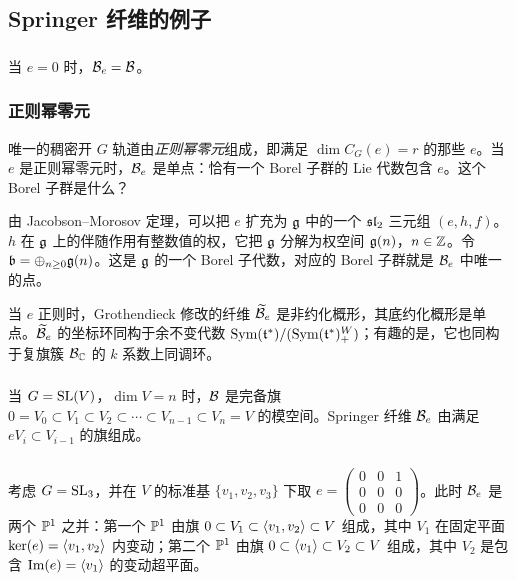 \subsection{Springer 纤维的例子}

\subsubsection{} 当 $e=0$ 时，$\sB_{e}=\sB$。

\subsubsection{正则幂零元}\label{sss:regular Spr} 唯一的稠密开 $G$ 轨道由{\em 正则幂零元}组成，即满足 $\dim C_{G}(e)=r$ 的那些 $e$。当 $e$ 是正则幂零元时，$\sB_{e}$ 是单点：恰有一个 Borel 子群的 Lie 代数包含 $e$。这个 Borel 子群是什么？

由 Jacobson--Morosov 定理，可以把 $e$ 扩充为 $\frg$ 中的一个 $\sl_{2}$ 三元组 $(e,h,f)$。$h$ 在 $\frg$ 上的伴随作用有整数值的权，它把 $\frg$ 分解为权空间 $\frg(n)$，$n\in\ZZ$。令 $\frb=\oplus_{n\geq 0}\frg(n)$。这是 $\frg$ 的一个 Borel 子代数，对应的 Borel 子群就是 $\sB_{e}$ 中唯一的点。

当 $e$ 正则时，Grothendieck 修改的纤维 $\tB_{e}$ 是非约化概形，其底约化概形是单点。$\tB_{e}$ 的坐标环同构于余不变代数 $\Sym(\frt^{*})/(\Sym(\frt^{*})^{W}_{+})$；有趣的是，它也同构于复旗簇 $\calB_{\CC}$ 的 $k$ 系数上同调环。

\subsubsection{} 当 $G=\SL(V)$，$\dim V=n$ 时，$\sB$ 是完备旗 $0=V_{0}\subset V_{1}\subset V_{2}\subset\cdots\subset V_{n-1}\subset V_{n}=V$ 的模空间。Springer 纤维 $\sB_{e}$ 由满足 $eV_{i}\subset V_{i-1}$ 的旗组成。

\subsubsection{}\label{sss:SL3 subreg} 考虑 $G=\SL_{3}$，并在 $V$ 的标准基 $\{v_{1}, v_{2}, v_{3}\}$ 下取 $e=\begin{pmatrix} 0 & 0 & 1\\  0 & 0& 0 \\  0 & 0& 0 \end{pmatrix}$。此时 $\sB_{e}$ 是两个 $\PP^{1}$ 之并：第一个 $\PP^{1}$ 由旗 $0\subset V_{1}\subset \jiao{v_{1}, v_{2}}\subset V$ 组成，其中 $V_{1}$ 在固定平面 $\ker(e)=\jiao{v_{1},v_{2}}$ 内变动；第二个 $\PP^{1}$ 由旗 $0\subset \jiao{v_{1}}\subset V_{2}\subset V$ 组成，其中 $V_{2}$ 是包含 $\Im(e)=\jiao{v_{1}}$ 的变动超平面。

